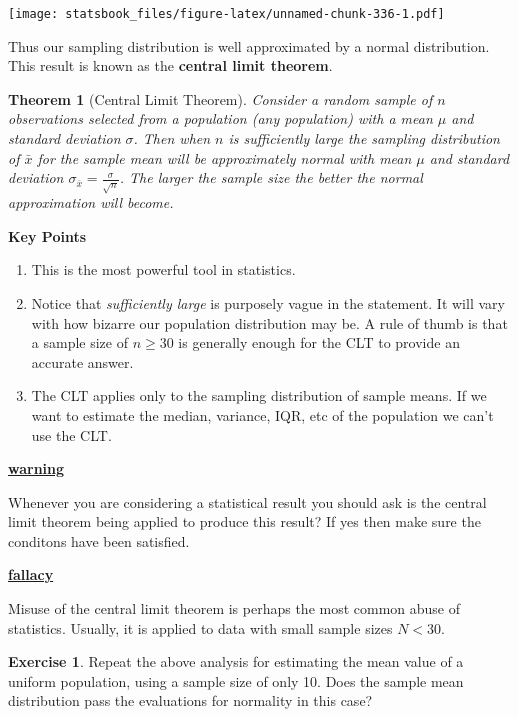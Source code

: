 \documentclass[
]{book}
\providecommand{\tightlist}{%
  \setlength{\itemsep}{0pt}\setlength{\parskip}{0pt}}
\newenvironment{rmdblock}[1]
  {\begin{shaded*}
  \centerline{\underline{\textbf{#1}}}

  }
  {
  \end{shaded*}
  }
\newenvironment{warning}
  {\begin{rmdblock}{warning}}
  {\end{rmdblock}}
\newenvironment{fallacy}
  {\begin{rmdblock}{fallacy}}
  {\end{rmdblock}}
\newtheorem{theorem}{Theorem}[chapter]
\theoremstyle{definition}
\theoremstyle{definition}
\theoremstyle{definition}
\newtheorem{exercise}{Exercise}[chapter]
\theoremstyle{definition}
\theoremstyle{remark}
\begin{document}
\texttt{[image: statsbook\_files/figure-latex/unnamed-chunk-336-1.pdf]}

Thus our sampling distribution is well approximated by a normal distribution. This result is known as the \textbf{central limit theorem}.

\begin{theorem}[Central Limit Theorem]
\protect\hypertarget{thm:unnamed-chunk-337}{}\label{thm:unnamed-chunk-337}Consider a random sample of \(n\) observations selected from a population (\emph{any} population) with a mean \(\mu\) and standard deviation \(\sigma\). Then when \(n\) is sufficiently large the sampling distribution of \(\bar{x}\) for the sample mean will be \emph{approximately normal} with mean \(\mu\) and standard deviation \(\sigma_{\bar{x}}=\frac{\sigma}{\sqrt{n}}\). The larger the sample size the better the normal approximation will become.
\end{theorem}

\textbf{Key Points}

\begin{enumerate}
\def\labelenumi{\arabic{enumi}.}
\tightlist
\item
  This is the most powerful tool in statistics.
\item
  Notice that \emph{sufficiently large} is purposely vague in the statement. It will vary with how bizarre our population distribution may be. A rule of thumb is that a sample size of \(n\geq 30\) is generally enough for the CLT to provide an accurate answer.
\item
  The CLT applies only to the sampling distribution of sample means. If we want to estimate the median, variance, IQR, etc of the population we can't use the CLT.
\end{enumerate}

\begin{warning}
Whenever you are considering a statistical result you should ask is the central limit theorem being applied to produce this result? If yes then make sure the conditons have been satisfied.
\end{warning}

\begin{fallacy}
Misuse of the central limit theorem is perhaps the most common abuse of statistics. Usually, it is applied to data with small sample sizes \(N<30\).
\end{fallacy}

\begin{exercise}
\protect\hypertarget{exr:unnamed-chunk-340}{}\label{exr:unnamed-chunk-340}Repeat the above analysis for estimating the mean value of a uniform population, using a sample size of only 10. Does the sample mean distribution pass the evaluations for normality in this case?
\end{exercise}
\end{document}
